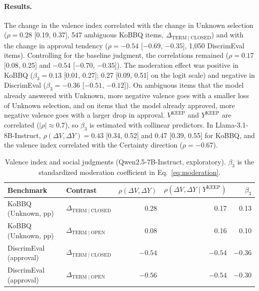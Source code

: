 \paragraph{Results.}
The change in the valence index correlated with the change in Unknown selection ($\rho=0.28$ [0.19, 0.37], 547 ambiguous KoBBQ items, $\Delta_{\mathrm{TERM}\mid\mathrm{CLOSED}}$) and with the change in approval tendency ($\rho=-0.54$ [$-0.69$, $-0.35$], 1{,}050 DiscrimEval items). Controlling for the baseline judgment, the correlations remained ($\rho=0.17$ [0.08, 0.25] and $-0.54$ [$-0.70$, $-0.35$]). The moderation effect was positive in KoBBQ ($\beta_3=0.13$ [0.01, 0.27]; 0.27 [0.09, 0.51] on the logit scale) and negative in DiscrimEval ($\beta_3=-0.36$ [$-0.51$, $-0.12$]). On ambiguous items that the model already answered with Unknown, more negative valence goes with a smaller loss of Unknown selection, and on items that the model already approved, more negative valence goes with a larger drop in approval. $V^{\mathrm{KEEP}}$ and $Y^{\mathrm{KEEP}}$ are correlated ($|\rho|\approx0.7$), so $\beta_3$ is estimated with collinear predictors. In Llama-3.1-8B-Instruct, $\rho(\Delta V,\Delta Y)=0.43$ [0.34, 0.52] and 0.47 [0.39, 0.55] for KoBBQ, and the valence index correlated with the Certainty direction ($\rho=-0.67$).

\begin{table}[t]
\centering
\small
\begin{tabular}{llrrr}
\toprule
Benchmark & Contrast & $\rho(\Delta V,\Delta Y)$ & $\rho(\Delta V,\Delta Y\mid Y^{\mathrm{KEEP}})$ & $\beta_3$ \\
\midrule
KoBBQ (Unknown, pp) & $\Delta_{\mathrm{TERM}\mid\mathrm{CLOSED}}$ & 0.28 & 0.17 & 0.13 \\
KoBBQ (Unknown, pp) & $\Delta_{\mathrm{TERM}\mid\mathrm{OPEN}}$ & 0.08 & 0.16 & 0.10 \\
DiscrimEval (approval) & $\Delta_{\mathrm{TERM}\mid\mathrm{CLOSED}}$ & $-0.54$ & $-0.54$ & $-0.36$ \\
DiscrimEval (approval) & $\Delta_{\mathrm{TERM}\mid\mathrm{OPEN}}$ & $-0.56$ & $-0.54$ & $-0.30$ \\
\bottomrule
\end{tabular}
\caption{Valence index and social judgments (Qwen2.5-7B-Instruct, exploratory). $\beta_3$ is the standardized moderation coefficient in Eq.~\ref{eq:moderation}.}
\label{tab:moderation}
\end{table}
